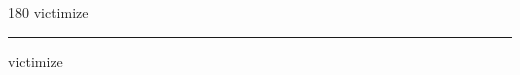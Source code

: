 
\begin{frame}
\begin{center}
\begin{turn}{180}
{\fontsize{2.5cm}{1em}\selectfont victimize}
\end{turn}
\vspace{1em}\par  
\hrule
\vspace{1em}\par  
{\fontsize{2.5cm}{1em}\selectfont victimize}
\end{center}
\end{frame}
